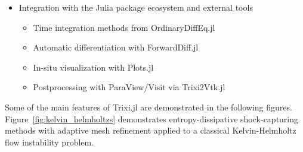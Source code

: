 \documentclass{juliacon}
\newcommand{\trixi}{Trixi.jl\xspace}
\begin{document}
\begin{itemize}
  \item Integration with the Julia package ecosystem and external tools
  \begin{itemize}
    \item Time integration methods from OrdinaryDiffEq.jl
    \item Automatic differentiation with ForwardDiff.jl
    \item In-situ visualization with Plots.jl
    \item Postprocessing with ParaView/Visit via Trixi2Vtk.jl
  \end{itemize}
\end{itemize}

Some of the main features of \trixi are demonstrated in the following figures.
Figure~\ref{fig:kelvin_helmholtzs} demonstrates entropy-dissipative shock-capturing
methods with adaptive mesh refinement applied to a classical Kelvin-Helmholtz
flow instability problem.
\end{document}
